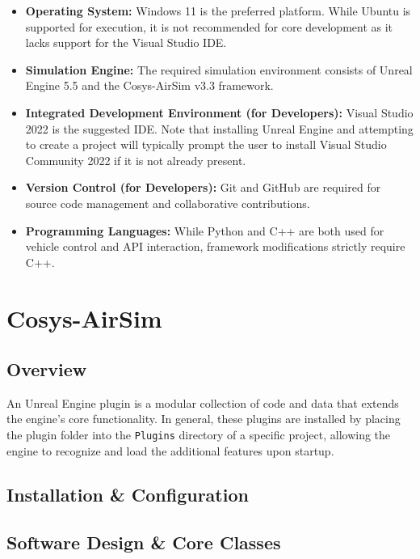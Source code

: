 \documentclass{article}
\begin{document}
\begin{itemize}
    \item \textbf{Operating System:} Windows 11 is the preferred platform. While Ubuntu is supported for execution, it is not recommended for core development as it lacks support for the Visual Studio IDE.
    \item \textbf{Simulation Engine:} The required simulation environment consists of Unreal Engine 5.5 and the Cosys-AirSim v3.3 framework.
    \item \textbf{Integrated Development Environment (for Developers):} Visual Studio 2022 is the suggested IDE. Note that installing Unreal Engine and attempting to create a project will typically prompt the user to install Visual Studio Community 2022 if it is not already present.
    \item \textbf{Version Control (for Developers):} Git and GitHub are required for source code management and collaborative contributions.
    \item \textbf{Programming Languages:} While Python and C++ are both used for vehicle control and API interaction, framework modifications strictly require C++.
\end{itemize}\newpage

\section{Cosys-AirSim}

\subsection{Overview}
\noindent
An Unreal Engine plugin is a modular collection of code and data that extends the engine's core functionality. In general, these plugins are installed by placing the plugin folder into the \texttt{Plugins} directory of a specific project, allowing the engine to recognize and load the additional features upon startup.

\subsection{Installation \& Configuration}
\noindent

\newpage

\subsection{Software Design \& Core Classes}
\noindent

\newpage
\end{document}

